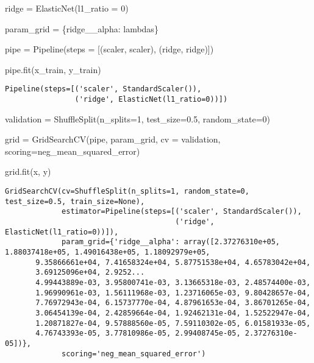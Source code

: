 \documentclass[
  letterpaper,
  DIV=11,
  numbers=noendperiod]{scrreprt}
\newenvironment{Shaded}{\begin{snugshade}}{\end{snugshade}}
\newcommand{\DecValTok}[1]{\textcolor[rgb]{0.68,0.00,0.00}{#1}}
\newcommand{\FloatTok}[1]{\textcolor[rgb]{0.68,0.00,0.00}{#1}}
\newcommand{\NormalTok}[1]{\textcolor[rgb]{0.00,0.23,0.31}{#1}}
\newcommand{\OperatorTok}[1]{\textcolor[rgb]{0.37,0.37,0.37}{#1}}
\newcommand{\StringTok}[1]{\textcolor[rgb]{0.13,0.47,0.30}{#1}}
\begin{document}
\begin{Shaded}
\begin{Highlighting}[]
\NormalTok{ridge }\OperatorTok{=}\NormalTok{ ElasticNet(l1\_ratio }\OperatorTok{=} \DecValTok{0}\NormalTok{)}

\NormalTok{param\_grid }\OperatorTok{=}\NormalTok{ \{}\StringTok{\textquotesingle{}ridge\_\_alpha\textquotesingle{}}\NormalTok{: lambdas\}}

\NormalTok{pipe }\OperatorTok{=}\NormalTok{ Pipeline(steps }\OperatorTok{=}\NormalTok{ [(}\StringTok{\textquotesingle{}scaler\textquotesingle{}}\NormalTok{, scaler), (}\StringTok{\textquotesingle{}ridge\textquotesingle{}}\NormalTok{, ridge)])}

\NormalTok{pipe.fit(x\_train, y\_train)}
\end{Highlighting}
\end{Shaded}

\begin{verbatim}
Pipeline(steps=[('scaler', StandardScaler()),
                ('ridge', ElasticNet(l1_ratio=0))])
\end{verbatim}

\begin{Shaded}
\begin{Highlighting}[]
\NormalTok{validation }\OperatorTok{=}\NormalTok{ ShuffleSplit(n\_splits}\OperatorTok{=}\DecValTok{1}\NormalTok{,}
\NormalTok{                              test\_size}\OperatorTok{=}\FloatTok{0.5}\NormalTok{,}
\NormalTok{                              random\_state}\OperatorTok{=}\DecValTok{0}\NormalTok{)}

\NormalTok{grid }\OperatorTok{=}\NormalTok{ GridSearchCV(pipe, param\_grid, cv }\OperatorTok{=}\NormalTok{ validation, scoring}\OperatorTok{=}\StringTok{\textquotesingle{}neg\_mean\_squared\_error\textquotesingle{}}\NormalTok{)}

\NormalTok{grid.fit(x, y)}
\end{Highlighting}
\end{Shaded}

\begin{verbatim}
GridSearchCV(cv=ShuffleSplit(n_splits=1, random_state=0, test_size=0.5, train_size=None),
             estimator=Pipeline(steps=[('scaler', StandardScaler()),
                                       ('ridge', ElasticNet(l1_ratio=0))]),
             param_grid={'ridge__alpha': array([2.37276310e+05, 1.88037418e+05, 1.49016438e+05, 1.18092979e+05,
       9.35866661e+04, 7.41658324e+04, 5.87751538e+04, 4.65783042e+04,
       3.69125096e+04, 2.9252...
       4.99443889e-03, 3.95800741e-03, 3.13665318e-03, 2.48574400e-03,
       1.96990961e-03, 1.56111968e-03, 1.23716065e-03, 9.80428657e-04,
       7.76972943e-04, 6.15737770e-04, 4.87961653e-04, 3.86701265e-04,
       3.06454139e-04, 2.42859664e-04, 1.92462131e-04, 1.52522947e-04,
       1.20871827e-04, 9.57888560e-05, 7.59110302e-05, 6.01581933e-05,
       4.76743393e-05, 3.77810986e-05, 2.99408745e-05, 2.37276310e-05])},
             scoring='neg_mean_squared_error')
\end{verbatim}
\end{document}
